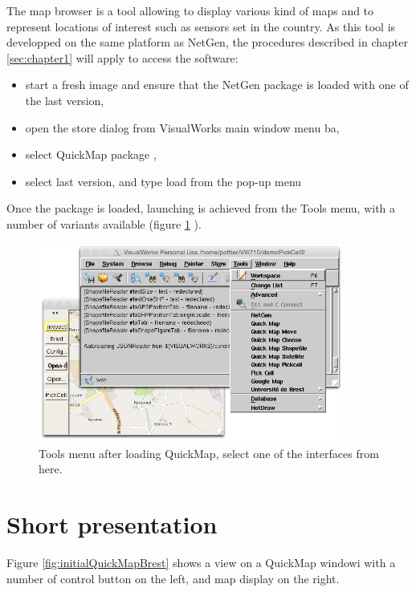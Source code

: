 The map browser is a tool allowing to display various kind of maps and to represent 
locations of interest such as sensors set in the country. 
As this tool is developped on the same platform as NetGen, the procedures described 
in chapter \ref{sec:chapter1} will apply to access the software: 
\begin{itemize}
\item start a fresh image and ensure that the NetGen package is loaded with one of the last version,
\item open the store dialog from VisualWorks main window menu ba,
\item select QuickMap package ,
\item select last version, and type load from the pop-up menu
\end{itemize}

Once the package is loaded, launching is achieved from the Tools menu, with a number of variants
available (figure \ref{fig:toolsMenu} ).

\begin{figure}[hbtp]
\begin{center}
\includegraphics[width=10cm]{toolsMenu.png}
\caption{Tools menu after loading QuickMap, select one of the interfaces from here.}
\label{fig:toolsMenu}
\end{center}
\end{figure}


\section{Short presentation}

Figure 
\ref{fig:initialQuickMapBrest} shows a view on a QuickMap windowi with a number
of control button on the left, and map display on the right.


